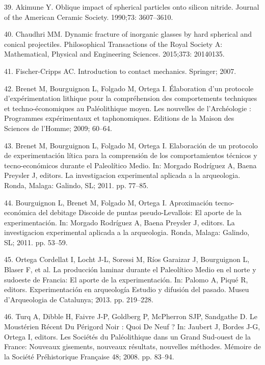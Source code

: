 \documentclass[10pt,letterpaper]{article}
\newenvironment{cslreferences}%
  {}%
  {\par}
\begin{document}
\begin{cslreferences}
\leavevmode\hypertarget{ref-akimune_oblique_1990}{}%
39. Akimune Y. Oblique impact of spherical particles onto silicon
nitride. Journal of the American Ceramic Society. 1990;73: 3607--3610.

\leavevmode\hypertarget{ref-chaudhri_dynamic_2015}{}%
40. Chaudhri MM. Dynamic fracture of inorganic glasses by hard spherical
and conical projectiles. Philosophical Transactions of the Royal Society
A: Mathematical, Physical and Engineering Sciences. 2015;373: 20140135.

\leavevmode\hypertarget{ref-fischer-cripps_introduction_2007}{}%
41. Fischer-Cripps AC. Introduction to contact mechanics. Springer;
2007.

\leavevmode\hypertarget{ref-brenet_elaboration_2009}{}%
42. Brenet M, Bourguignon L, Folgado M, Ortega I. Élaboration d'un
protocole d'expérimentation lithique pour la compréhension des
comportements techniques et techno-économiques au Paléolithique moyen.
Les nouvelles de l'Archéologie : Programmes expérimentaux et
taphonomiques. Editions de la Maison des Sciences de l'Homme; 2009;
60--64.

\leavevmode\hypertarget{ref-brenet_elaboracion_2011}{}%
43. Brenet M, Bourguignon L, Folgado M, Ortega I. Elaboración de un
protocolo de experimentación lítica para la comprensión de los
comportamientos técnicos y tecno-económicos durante el Paleolítico
Medio. In: Morgado Rodríguez A, Baena Preysler J, editors. La
investigacion experimental aplicada a la arqueologia. Ronda, Malaga:
Galindo, SL; 2011. pp. 77--85.

\leavevmode\hypertarget{ref-bourguignon_aproximacion_2011}{}%
44. Bourguignon L, Brenet M, Folgado M, Ortega I. Aproximación
tecno-económica del debitage Discoide de puntas pseudo-Levallois: El
aporte de la experimentación. In: Morgado Rodríguez A, Baena Preysler J,
editors. La investigacion experimental aplicada a la arqueologia. Ronda,
Malaga: Galindo, SL; 2011. pp. 53--59.

\leavevmode\hypertarget{ref-ortega_cordellat_produccion_2013}{}%
45. Ortega Cordellat I, Locht J-L, Soressi M, Ríos Garaizar J,
Bourguignon L, Blaser F, et al. La producción laminar durante el
Paleolítico Medio en el norte y sudoeste de Francia: El aporte de la
experimentación. In: Palomo A, Piqué R, editors. Experimentación en
arqueología Estudio y difusión del pasado. Museu d'Arqueologia de
Catalunya; 2013. pp. 219--228.

\leavevmode\hypertarget{ref-jaubert_mousterien_2008}{}%
46. Turq A, Dibble H, Faivre J-P, Goldberg P, McPherron SJP, Sandgathe
D. Le Moustérien Récent Du Périgord Noir : Quoi De Neuf ? In: Jaubert J,
Bordes J-G, Ortega I, editors. Les Sociétés du Paléolithique dans un
Grand Sud-ouest de la France: Nouveaux gisements, nouveaux résultats,
nouvelles méthodes. Mémoire de la Société Préhistorique Française 48;
2008. pp. 83--94.


\end{cslreferences}
\end{document}
